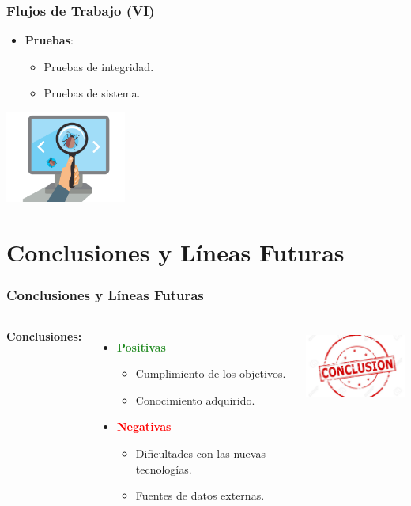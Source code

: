 \documentclass[usenames,dvipsnames]{beamer}
\begin{document}
\begin{frame}
\frametitle{Flujos de Trabajo (VI)}
\begin{itemize}
\item \textbf{Pruebas}:
	\begin{itemize}
		\item Pruebas de integridad.
		\item Pruebas de sistema.
	\end{itemize}
\end{itemize}

\vspace{0.6cm}
\centering
\includegraphics[height=3cm, angle=0]{./img/testing.png}

\end{frame}

\section{Conclusiones y Líneas Futuras}
\begin{frame}
\frametitle{Conclusiones y Líneas Futuras}
\begin{columns}[c] %

\textbf{Conclusiones:}
\vspace{0.4cm}
\begin{itemize}

	\item \textbf{\textcolor{ForestGreen}{Positivas}}
		\begin{itemize}
			\item Cumplimiento de los objetivos.
			\item Conocimiento adquirido.
		\end{itemize}
	\vspace{0.5cm}
	\item \textbf{\textcolor{Red}{Negativas}}
		\begin{itemize}
			\item Dificultades con las nuevas tecnologías.
			\item Fuentes de datos externas.
		\end{itemize}
\end{itemize}

\vspace{-3cm}
\includegraphics[height=2.5cm, angle=0]{./img/conlcusion.jpg}
\end{columns}
\end{frame}
\end{document}
